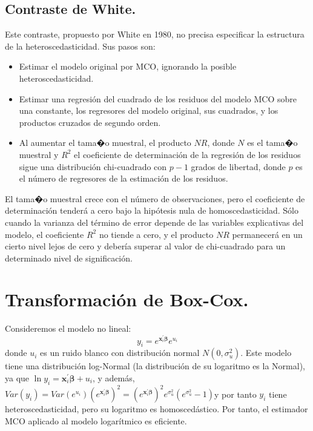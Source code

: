 \subsection{Contraste de White.}

Este contraste, propuesto por White en 1980, no precisa especificar
la estructura de la heteroscedasticidad. Sus pasos son:
\begin{itemize}
\item Estimar el modelo original por MCO, ignorando la posible heteroscedasticidad.
\item Estimar una regresi\'on del cuadrado de los residuos del modelo MCO
sobre una constante, los regresores del modelo original, sus cuadrados,
y los productos cruzados de segundo orden.
\item Al aumentar el tama�o muestral, el producto $NR$, donde $N$ es el
tama�o muestral y $R^{2}$ el coeficiente de determinaci\'on de la regresi\'on
de los residuos sigue una distribuci\'on chi-cuadrado con $p-1$ grados
de libertad, donde $p$ es el n\'umero de regresores de la estimaci\'on
de los residuos.
\end{itemize}
El tama�o muestral crece con el n\'umero de observaciones, pero el coeficiente
de determinaci\'on tender\'a a cero bajo la hip\'otesis nula de homoscedasticidad.
S\'olo cuando la varianza del t\'ermino de error depende de las variables
explicativas del modelo, el coeficiente $R^{2}$ no tiende a cero,
y el producto $NR$ permanecer\'a en un cierto nivel lejos de cero y
deber\'ia superar al valor de chi-cuadrado para un determinado nivel
de significaci\'on.


\section{Transformaci\'on de Box-Cox.}

Consideremos el modelo no lineal:
\[
y_{i}=e^{\boldsymbol{x}_{i}^{\prime}\boldsymbol{\beta}}e^{u_{i}}
\]
 donde $u_{i}$ es un ruido blanco con distribuci\'on normal $N\left(0,\sigma_{u}^{2}\right)$.
Este modelo tiene una distribuci\'on log-Normal (la distribuci\'on de
su logaritmo es la Normal), ya que $\ln y_{i}=\boldsymbol{x}_{i}^{\prime}\boldsymbol{\beta}+u_{i}$,
y adem\'as, $Var\left(y_{i}\right)=Var\left(e^{u_{i}}\right)\left(e^{\boldsymbol{x}_{i}^{\prime}\boldsymbol{\beta}}\right)^{2}=\left(e^{\boldsymbol{x}_{i}^{\prime}\boldsymbol{\beta}}\right)^{2}e^{\sigma_{u}^{2}}\left(e^{\sigma_{u}^{2}}-1\right)$y
por tanto $y_{i}$ tiene heteroscedasticidad, pero su logaritmo es
homosced\'astico. Por tanto, el estimador MCO aplicado al modelo logar\'itmico
es eficiente.

